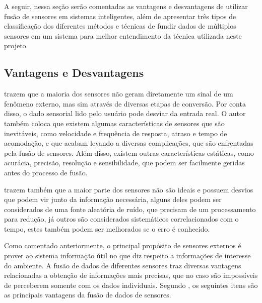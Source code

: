 \documentclass[acronym, symbols, table]{fei}
\begin{document}
		A seguir, nessa seção serão comentadas as vantagens e desvantagens de utilizar fusão de sensores em sistemas inteligentes, além de apresentar três tipos de classificação dos diferentes métodos e técnicas de fundir dados de múltiplos sensores em um sistema para melhor entendimento da técnica utilizada neste projeto.
		
		\subsection{Vantagens e Desvantagens}
		
			\textcite{fung2017sensor} trazem que a maioria dos sensores não geram diretamente um sinal de um fenômeno externo, mas sim através de diversas etapas de conversão. Por conta disso, o dado sensorial lido pelo usuário pode desviar da entrada real. O autor também coloca que existem algumas características de sensores que são inevitáveis, como velocidade e frequência de resposta, atraso e tempo de acomodação, e que acabam levando a diversas complicações, que são enfrentadas pela fusão de sensores. Além disso, existem outras características estáticas, como acurácia, precisão, resolução e sensibilidade, que podem ser facilmente geridas antes do processo de fusão.
			
			\textcite{fung2017sensor} trazem também que a maior parte dos sensores não são ideais e possuem desvios que podem vir junto da informação necessária, alguns deles podem ser considerados de uma fonte aleatória de ruído, que precisam de um processamento para redução, já outros são considerados sistemáticos correlacionados com o tempo, estes também podem ser melhorados se o erro é conhecido.
			
			Como comentado anteriormente, o principal propósito de sensores externos é prover ao sistema informação útil no que diz respeito a informações de interesse do ambiente. A fusão de dados de diferentes sensores traz diversas vantagens relacionadas a obtenção de informações mais precisas, que no caso são impossíveis de perceberem somente com os dados individuais. Segundo \textcite{alatise2020review}, os seguintes itens são as principais vantagens da fusão de dados de sensores.
			
\end{document}
